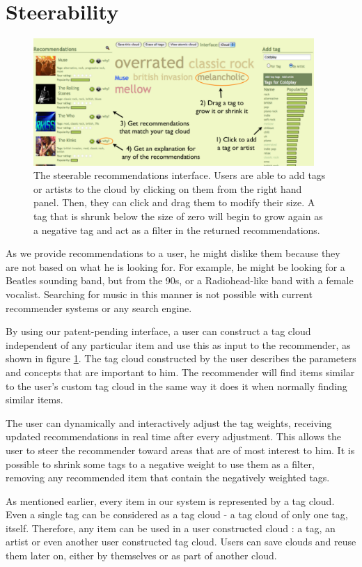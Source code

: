 \documentclass[a4paper,9pt,twocolumn]{article}
\begin{document}
\section{Steerability}
\begin{figure}
\begin{center}
\includegraphics[width=0.95\textwidth]{steerable-withtxt}
\end{center}
\caption{The steerable recommendations interface. Users are able to add tags or artists to the cloud by clicking on them from the right hand panel. Then, they can click and drag them to modify their size. A tag that is shrunk below the size of zero will begin to grow again as a negative tag and act as a filter in the returned recommendations.}
\label{fig:steerable}
\end{figure}

As we provide recommendations to a user, he might dislike them because they are not
based on what he is looking for. For example, he might be looking for a Beatles sounding 
band, but from the 90s, or a Radiohead-like band with a female vocalist. Searching for 
music in this manner is not possible with current recommender systems or any search engine.

By using our patent-pending interface, a user can construct a tag cloud independent 
of any particular item and use this as input to the recommender, as shown in figure \ref{fig:steerable}.
The tag cloud constructed by the user describes the
parameters and concepts that are important to him. The recommender will find items similar to the user's custom
tag cloud in the same way it does it when normally finding similar items.

The user can dynamically and interactively adjust the tag
weights, receiving updated
recommendations in real time after every adjustment. This
allows the user to steer the recommender toward
areas that are of most interest to him. It is possible to shrink some tags to a negative weight to use them as a filter, removing 
any recommended item that contain the negatively weighted tags.

As mentioned earlier, every item in our system is represented by a tag cloud. Even a single tag can be considered as a tag cloud - a tag cloud of only one tag, itself. 
Therefore, any item can be used in a user constructed cloud : a tag, an artist or even another user constructed tag cloud. Users can 
save clouds and reuse them later on, either by themselves or as part of another cloud.
\end{document}
